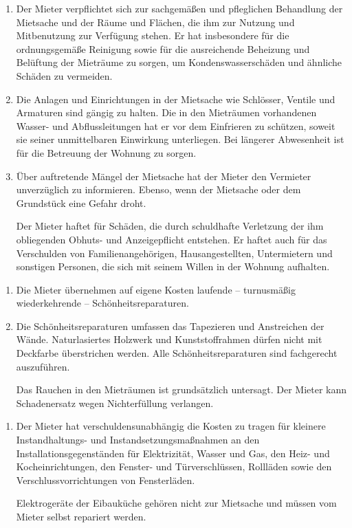\documentclass{scrreprt}[12pt,a4paper,twoside,duplex]
\begin{document}
\begin{contract}
	\begin{enumerate}
		\item Der Mieter verpflichtet sich zur sachgemäßen und pfleglichen Behandlung der Mietsache und der Räume und Flächen, die ihm zur Nutzung und Mitbenutzung zur Verfügung stehen. Er hat insbesondere für die ordnungsgemäße Reinigung sowie für die ausreichende Beheizung und Belüftung der Mieträume zu sorgen, um Kondenswasserschäden und ähnliche Schäden zu vermeiden.
		\item Die Anlagen und Einrichtungen in der Mietsache wie Schlösser, Ventile und Armaturen sind gängig zu halten. Die in den Mieträumen vorhandenen Wasser- und Abflussleitungen hat er vor dem Einfrieren zu schützen, soweit sie seiner unmittelbaren Einwirkung unterliegen. Bei längerer Abwesenheit ist für die Betreuung der Wohnung zu sorgen.
		\item Über auftretende Mängel der Mietsache hat der Mieter den Vermieter unverzüglich zu informieren. Ebenso, wenn der Mietsache oder dem Grundstück eine Gefahr droht.

		Der Mieter haftet für Schäden, die durch schuldhafte Verletzung der ihm obliegenden Obhuts- und Anzeigepflicht entstehen. Er haftet auch für das Verschulden von Familienangehörigen, Hausangestellten, Untermietern und sonstigen Personen, die sich mit seinem Willen in der Wohnung aufhalten.
	\end{enumerate}
\end{contract}

\begin{contract}
	\begin{enumerate}
		\item Die Mieter übernehmen auf eigene Kosten laufende – turnusmäßig wiederkehrende – Schönheitsreparaturen.
		\item Die Schönheitsreparaturen umfassen das Tapezieren und Anstreichen der Wände. Naturlasiertes Holzwerk und Kunststoffrahmen dürfen nicht mit Deckfarbe überstrichen werden. Alle Schönheitsreparaturen sind fachgerecht auszuführen.

		Das Rauchen in den Mieträumen ist grundsätzlich untersagt. Der Mieter kann Schadenersatz wegen Nichterfüllung verlangen.
	\end{enumerate}
\end{contract}

\begin{contract}
	\begin{enumerate}
		\item Der Mieter hat verschuldensunabhängig die Kosten zu tragen für kleinere Instandhaltungs- und Instandsetzungsmaßnahmen an den Installationsgegenständen für Elektrizität, Wasser und Gas, den Heiz- und Kocheinrichtungen, den Fenster- und Türverschlüssen, Rollläden sowie den Verschlussvorrichtungen von Fensterläden.

		Elektrogeräte der Eibauküche gehören nicht zur Mietsache und müssen vom Mieter selbst repariert werden.
	\end{enumerate}
\end{contract}
\end{document}
